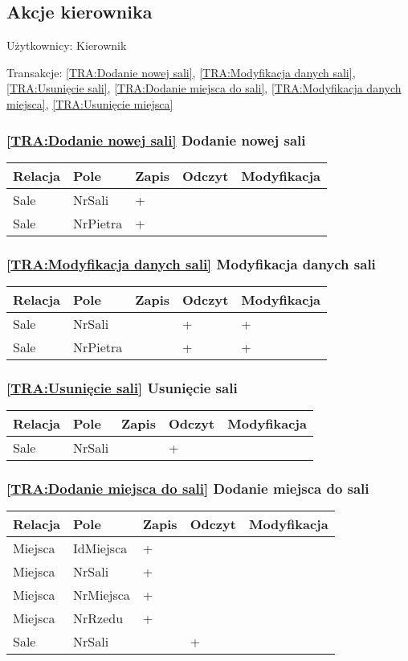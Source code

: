 \subsection{Akcje kierownika}
Użytkownicy: Kierownik

Transakcje: \ref{TRA:Dodanie nowej sali}, \ref{TRA:Modyfikacja danych sali}, \ref{TRA:Usunięcie sali}, \ref{TRA:Dodanie miejsca do sali}, \ref{TRA:Modyfikacja danych miejsca}, \ref{TRA:Usunięcie miejsca}
\subsubsection*{\ref{TRA:Dodanie nowej sali} Dodanie nowej sali}
\begin{tabularx}{\textwidth}{|Y|Y|Y|Y|Y|}\hline
Relacja & Pole & Zapis & Odczyt & Modyfikacja \\\hline
Sale & NrSali & + &  & \\
Sale & NrPietra & + &  & \\
\hline\end{tabularx}
\subsubsection*{\ref{TRA:Modyfikacja danych sali} Modyfikacja danych sali}
\begin{tabularx}{\textwidth}{|Y|Y|Y|Y|Y|}\hline
Relacja & Pole & Zapis & Odczyt & Modyfikacja \\\hline
Sale & NrSali &  & + & +\\
Sale & NrPietra &  & + & +\\
\hline\end{tabularx}
\subsubsection*{\ref{TRA:Usunięcie sali} Usunięcie sali}
\begin{tabularx}{\textwidth}{|Y|Y|Y|Y|Y|}\hline
Relacja & Pole & Zapis & Odczyt & Modyfikacja \\\hline
Sale & NrSali &  & + & \\
\hline\end{tabularx}
\subsubsection*{\ref{TRA:Dodanie miejsca do sali} Dodanie miejsca do sali}
\begin{tabularx}{\textwidth}{|Y|Y|Y|Y|Y|}\hline
Relacja & Pole & Zapis & Odczyt & Modyfikacja \\\hline
Miejsca & IdMiejsca & + &  & \\
Miejsca & NrSali & + &  & \\
Miejsca & NrMiejsca & + &  & \\
Miejsca & NrRzedu & + &  & \\
Sale & NrSali &  & + & \\
\hline\end{tabularx}
